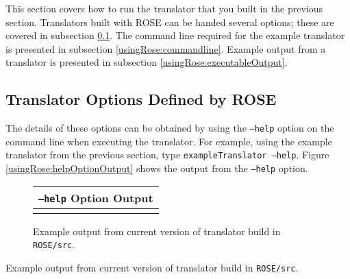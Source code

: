    This section covers how to run the translator that you built in the previous
section.  Translators built with ROSE can be handed several options; these are covered
in subsection \ref{usingRose:options}.  The command line required for the example
translator is presented in subsection \ref{usingRose:commandline}.  Example
output from a translator is presented in subsection
\ref{usingRose:executableOutput}.

\subsection{Translator Options Defined by ROSE}
\label{usingRose:options}
The details of
these options can be obtained by using the {\tt --help} option on the command line when
executing the translator.  For example, using the example translator from the 
previous section, type {\tt exampleTranslator --help}.  Figure
\ref{usingRose:helpOptionOutput} shows the output from the {\tt --help} option.


{\indent
{\mySmallFontSize

\begin{latexonly}
\begin{figure}[tb]
\begin{center}
\begin{tabular}{|c|} \hline
     {\tt --help} Option Output
\\\hline\hline
   
\\\hline
\end{tabular}
\end{center}
\caption{ Example output from current version of translator build in {\tt ROSE/src}. }
\end{figure}
\end{latexonly}

\begin{htmlonly}
   
   \vspace{0.5in}
   Example output from current version of translator build in {\tt ROSE/src}.
\end{htmlonly}

\label{usingRose:helpOptionOutput}

}
}

